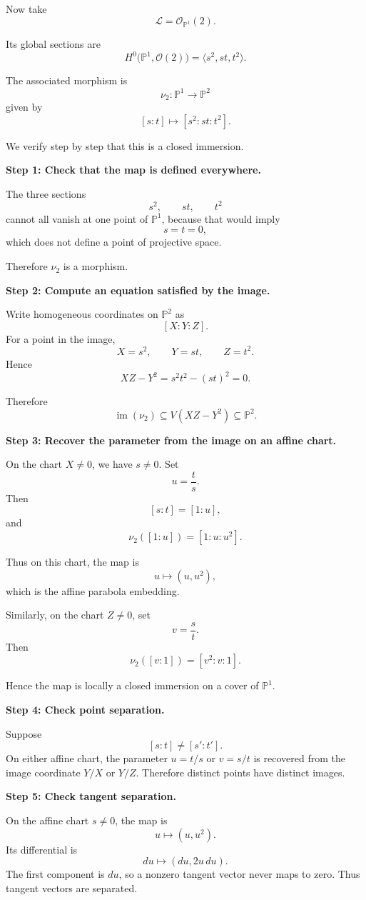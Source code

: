 \documentclass[12pt,a4paper]{article}
\theoremstyle{notespace}
\begin{document}
Now take
\[
\mathcal{L}=\mathcal{O}_{\mathbb{P}^{1}}(2).
\]

Its global sections are
\[
H^{0}\bigl(\mathbb{P}^{1},\mathcal{O}(2)\bigr)
=
\langle s^{2},st,t^{2}\rangle.
\]

The associated morphism is
\[
\nu_{2}:\mathbb{P}^{1}\longrightarrow \mathbb{P}^{2}
\]
given by
\[
[s:t]\longmapsto [s^{2}:st:t^{2}].
\]

We verify step by step that this is a closed immersion.

\textbf{Step 1: Check that the map is defined everywhere.}

The three sections
\[
s^{2},\qquad st,\qquad t^{2}
\]
cannot all vanish at one point of \(\mathbb{P}^{1}\), because that would imply
\[
s=t=0,
\]
which does not define a point of projective space.

Therefore \(\nu_{2}\) is a morphism.

\textbf{Step 2: Compute an equation satisfied by the image.}

Write homogeneous coordinates on \(\mathbb{P}^{2}\) as
\[
[X:Y:Z].
\]
For a point in the image,
\[
X=s^{2},
\qquad
Y=st,
\qquad
Z=t^{2}.
\]
Hence
\[
XZ-Y^{2}
=
s^{2}t^{2}-(st)^{2}
=
0.
\]

Therefore
\[
\operatorname{im}(\nu_{2})
\subseteq
V(XZ-Y^{2})\subseteq \mathbb{P}^{2}.
\]

\textbf{Step 3: Recover the parameter from the image on an affine chart.}

On the chart \(X\neq 0\), we have \(s\neq 0\). Set
\[
u=\frac{t}{s}.
\]
Then
\[
[s:t]=[1:u],
\]
and
\[
\nu_{2}([1:u])
=
[1:u:u^{2}].
\]

Thus on this chart, the map is
\[
u\longmapsto (u,u^{2}),
\]
which is the affine parabola embedding.

Similarly, on the chart \(Z\neq 0\), set
\[
v=\frac{s}{t}.
\]
Then
\[
\nu_{2}([v:1])
=
[v^{2}:v:1].
\]

Hence the map is locally a closed immersion on a cover of \(\mathbb{P}^{1}\).

\textbf{Step 4: Check point separation.}

Suppose
\[
[s:t]\neq [s':t'].
\]
On either affine chart, the parameter \(u=t/s\) or \(v=s/t\) is recovered from the image coordinate \(Y/X\) or \(Y/Z\). Therefore distinct points have distinct images.

\textbf{Step 5: Check tangent separation.}

On the affine chart \(s\neq 0\), the map is
\[
u\longmapsto (u,u^{2}).
\]
Its differential is
\[
du\longmapsto (du,2u\,du).
\]
The first component is \(du\), so a nonzero tangent vector never maps to zero. Thus tangent vectors are separated.
\end{document}
